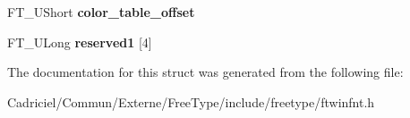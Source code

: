 \begin{DoxyCompactItemize}
\item 
F\+T\+\_\+\+U\+Short {\bfseries color\+\_\+table\+\_\+offset}\hypertarget{struct_f_t___win_f_n_t___header_rec___a83fa51bfd7fe814f8264416204701c60}{}\label{struct_f_t___win_f_n_t___header_rec___a83fa51bfd7fe814f8264416204701c60}

\item 
F\+T\+\_\+\+U\+Long {\bfseries reserved1} \mbox{[}4\mbox{]}\hypertarget{struct_f_t___win_f_n_t___header_rec___af01de9742608fb7a2a603d062f3783e3}{}\label{struct_f_t___win_f_n_t___header_rec___af01de9742608fb7a2a603d062f3783e3}

\end{DoxyCompactItemize}


The documentation for this struct was generated from the following file\+:\begin{DoxyCompactItemize}
\item 
Cadriciel/\+Commun/\+Externe/\+Free\+Type/include/freetype/ftwinfnt.\+h\end{DoxyCompactItemize}
